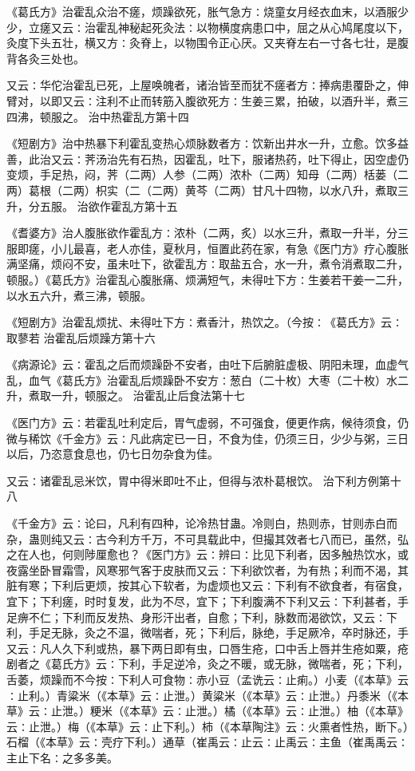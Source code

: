 \documentclass[a4paper,12pt,UTF8,twoside]{ctexbook}
\begin{document}
《葛氏方》治霍乱众治不瘥，烦躁欲死，胀气急方∶烧童女月经衣血末，以酒服少少，立瘥又云∶治霍乱神秘起死灸法∶以物横度病患口中，屈之从心鸠尾度以下，灸度下头五壮，横又方∶灸脊上，以物围令正心厌。又夹脊左右一寸各七壮，是腹背各灸三处也。

又云∶华佗治霍乱已死，上屋唤魄者，诸治皆至而犹不瘥者方∶捧病患覆卧之，伸臂对，以即又云∶注利不止而转筋入腹欲死方∶生姜三累，拍破，以酒升半，煮三四沸，顿服之。
治中热霍乱方第十四

《短剧方》治中热暴下利霍乱变热心烦脉数者方∶饮新出井水一升，立愈。饮多益善，此治又云∶荠汤治先有石热，因霍乱，吐下，服诸热药，吐下得止，因空虚仍变烦，手足热，闷，荠（二两）人参（二两）浓朴（二两）知母（二两）栝蒌（二两）葛根（二两）枳实（二（二两）黄芩（二两）甘凡十四物，以水八升，煮取三升，分五服。
治欲作霍乱方第十五

《耆婆方》治人腹胀欲作霍乱方∶浓朴（二两，炙）以水三升，煮取一升半，分三服即瘥，小儿最喜，老人亦佳，夏秋月，恒置此药在家，有急《医门方》疗心腹胀满坚痛，烦闷不安，虽未吐下，欲霍乱方∶取盐五合，水一升，煮令消煮取二升，顿服。）《葛氏方》治霍乱心腹胀痛、烦满短气，未得吐下方∶生姜若干姜一二升，以水五六升，煮三沸，顿服。

《短剧方》治霍乱烦扰、未得吐下方∶煮香汁，热饮之。（今按∶《葛氏方》云∶取蓼若
治霍乱后烦躁方第十六

《病源论》云∶霍乱之后而烦躁卧不安者，由吐下后腑脏虚极、阴阳未理，血虚气乱，血气《葛氏方》治霍乱后烦躁卧不安方∶葱白（二十枚）大枣（二十枚）水二升，煮取一升，顿服之。
治霍乱止后食法第十七

《医门方》云∶若霍乱吐利定后，胃气虚弱，不可强食，便更作病，候待须食，仍微与稀饮《千金方》云∶凡此病定已一日，不食为佳，仍须三日，少少与粥，三日以后，乃恣意食息也，仍七日勿杂食为佳。

又云∶诸霍乱忌米饮，胃中得米即吐不止，但得与浓朴葛根饮。
治下利方例第十八

《千金方》云∶论曰，凡利有四种，论冷热甘蛊。冷则白，热则赤，甘则赤白而杂，蛊则纯又云∶古今利方千万，不可具载此中，但撮其效者七八而已，虽然，弘之在人也，何则陟厘愈也？《医门方》云∶辨曰∶比见下利者，因多触热饮水，或夜露坐卧冒霜雪，风寒邪气客于皮肤而又云∶下利欲饮者，为有热；利而不渴，其脏有寒；下利后更烦，按其心下软者，为虚烦也又云∶下利有不欲食者，有宿食，宜下；下利瘥，时时复发，此为不尽，宜下；下利腹满不下利又云∶下利甚者，手足痹不仁；下利而反发热、身形汗出者，自愈；下利，脉数而渴欲饮，又云∶下利，手足无脉，灸之不温，微喘者，死；下利后，脉绝，手足厥冷，卒时脉还，手又云∶凡人久下利或热，暴下两日即有虫，口唇生疮，口中舌上唇并生疮如粟，疮剧者之《葛氏方》云∶下利，手足逆冷，灸之不暖，或无脉，微喘者，死；下利，舌萎，烦躁而不今按∶下利人可食物∶赤小豆（孟诜云∶止痢。）小麦（《本草》云∶止利。）青粱米（《本草》云∶止泄。）黄粱米（《本草》云∶止泄。）丹黍米（《本草》云∶止泄。）粳米（《本草》云∶止泄。）橘（《本草》云∶止泄。）柚（《本草》云∶止泄。）梅（《本草》云∶止下利。）柿（《本草陶注》云∶火熏者性热，断下。）石榴（《本草》云∶壳疗下利。）通草（崔禹云∶止云∶止禹云∶主鱼（崔禹禹云∶主止下名∶之多多美。
\end{document}
